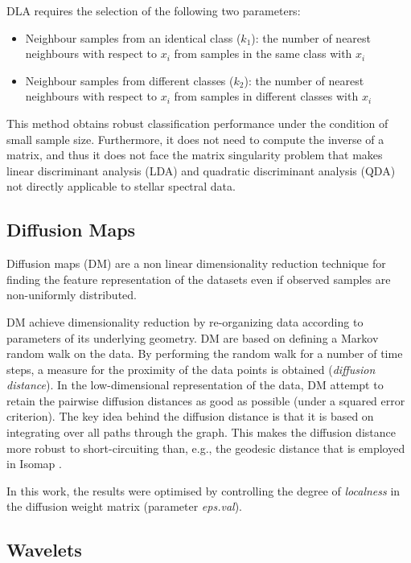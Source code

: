 \documentclass[a4paper,fleqn,usenatbib]{mnras}
\begin{document}
{DLA requires the selection of the following two parameters:
\begin{itemize}
\item Neighbour samples from an identical class ($k_1$): 
	the number of nearest neighbours with respect to $x_i$
	from samples in the same class with $x_i$
\item Neighbour samples from different classes ($k_2$): 
	the number of nearest neighbours with respect to $x_i$
	from samples in different classes with $x_i$
\end{itemize}

This method obtains robust classification performance under the
condition of small sample size. Furthermore, it does not need to
compute the inverse of a matrix, and thus it does not face the matrix
singularity problem that makes linear discriminant analysis (LDA) and
quadratic discriminant analysis (QDA) not directly applicable to
stellar spectral data.

\subsection{Diffusion Maps}

Diffusion maps (DM) \citep{coifman:06,nadler:06} are a non linear
dimensionality reduction technique for finding the feature
representation of the datasets even if observed samples are
non-uniformly distributed.

DM achieve dimensionality reduction by re-organizing data according to
parameters of its underlying geometry. DM are based on defining a
Markov random walk on the data. By performing the random walk for a
number of time steps, a measure for the proximity of the data points
is obtained (\textit{diffusion distance}). In the low-dimensional
representation of the data, DM attempt to retain the pairwise
diffusion distances as good as possible (under a squared error
criterion). The key idea behind the diffusion distance is that it is
based on integrating over all paths through the graph. This makes the
diffusion distance more robust to short-circuiting than, e.g., the
geodesic distance that is employed in Isomap \citep{tenenbaum:00}.

In this work, the results were optimised by controlling the degree 
of {\sl localness} in the diffusion weight matrix (parameter \textit{eps.val}).

\subsection{Wavelets}

}
\end{document}
